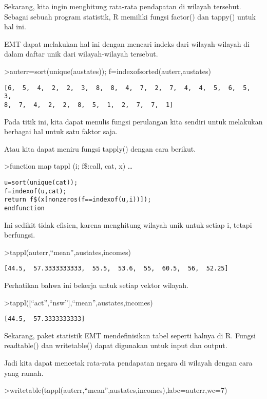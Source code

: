 \documentclass[
]{book}
\begin{document}
Sekarang, kita ingin menghitung rata-rata pendapatan di wilayah tersebut. Sebagai sebuah program statistik, R memiliki fungsi factor() dan tappy() untuk hal ini.

EMT dapat melakukan hal ini dengan mencari indeks dari wilayah-wilayah di dalam daftar unik dari wilayah-wilayah tersebut.

\textgreater auterr=sort(unique(austates)); f=indexofsorted(auterr,austates)

\begin{verbatim}
[6,  5,  4,  2,  2,  3,  8,  8,  4,  7,  2,  7,  4,  4,  5,  6,  5,  3,
8,  7,  4,  2,  2,  8,  5,  1,  2,  7,  7,  1]
\end{verbatim}

Pada titik ini, kita dapat menulis fungsi perulangan kita sendiri untuk melakukan berbagai hal untuk satu faktor saja.

Atau kita dapat meniru fungsi tapply() dengan cara berikut.

\textgreater function map tappl (i; f\$:call, cat, x) \ldots{}

\begin{verbatim}
u=sort(unique(cat));
f=indexof(u,cat);
return f$(x[nonzeros(f==indexof(u,i))]);
endfunction
\end{verbatim}

Ini sedikit tidak efisien, karena menghitung wilayah unik untuk setiap i, tetapi berfungsi.

\textgreater tappl(auterr,``mean'',austates,incomes)

\begin{verbatim}
[44.5,  57.3333333333,  55.5,  53.6,  55,  60.5,  56,  52.25]
\end{verbatim}

Perhatikan bahwa ini bekerja untuk setiap vektor wilayah.

\textgreater tappl({[}``act'',``nsw''{]},``mean'',austates,incomes)

\begin{verbatim}
[44.5,  57.3333333333]
\end{verbatim}

Sekarang, paket statistik EMT mendefinisikan tabel seperti halnya di R. Fungsi readtable() dan writetable() dapat digunakan untuk input dan output.

Jadi kita dapat mencetak rata-rata pendapatan negara di wilayah dengan cara yang ramah.

\textgreater writetable(tappl(auterr,``mean'',austates,incomes),labc=auterr,wc=7)
\end{document}
